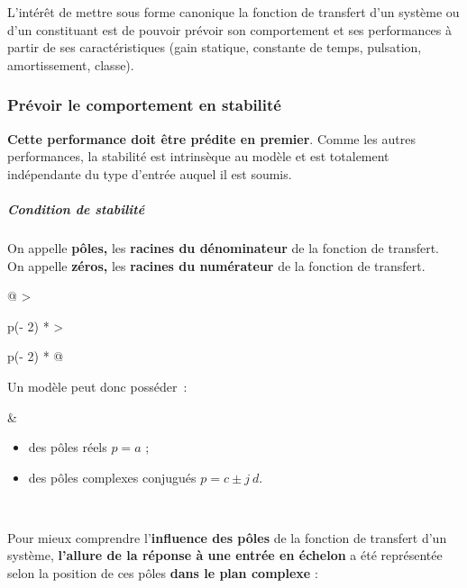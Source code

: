 L'intérêt de mettre sous forme canonique la fonction de transfert d'un système ou d'un constituant est de pouvoir prévoir son comportement et ses performances à partir de ses caractéristiques (gain statique, constante de temps, pulsation, amortissement, classe).

\hypertarget{mod-pruxe9voir-le-comportement-en-stabilituxe9}{%
\subsubsection{Prévoir le comportement en stabilité}\label{mod-pruxe9voir-le-comportement-en-stabilituxe9}}

\textbf{Cette performance doit être prédite en premier}. Comme les autres performances, la stabilité est intrinsèque au modèle et est totalement indépendante du type d'entrée auquel il est soumis.

\hypertarget{mod-condition-de-stabilituxe9}{%
\subparagraph*{Condition de stabilité}\label{mod-condition-de-stabilituxe9}}

On appelle \textbf{pôles,} les \textbf{racines du dénominateur} de la fonction de transfert.\\
On appelle \textbf{zéros,} les \textbf{racines du numérateur} de la fonction de transfert.

\begin{longtable}[]{@{}
  >{\raggedright\arraybackslash}p{(\columnwidth - 2\tabcolsep) * }
  >{\raggedright\arraybackslash}p{(\columnwidth - 2\tabcolsep) * }@{}}
\toprule\noalign{}
\begin{minipage}[b]{\linewidth}\raggedright
Un modèle peut donc posséder~:
\end{minipage} & \begin{minipage}[b]{\linewidth}\raggedright
\begin{itemize}
\item
  des pôles réels \(p = a\) ;
\item
  des pôles complexes conjugués \(p = c \pm j\ d\).
\end{itemize}
\end{minipage} \\
\midrule\noalign{}
\endhead
\bottomrule\noalign{}
\endlastfoot
\end{longtable}

Pour mieux comprendre l'\textbf{influence des pôles} de la fonction de transfert d'un système, \textbf{l'allure de la réponse à une entrée en échelon} a été représentée selon la position de ces pôles \textbf{dans le plan complexe} :

